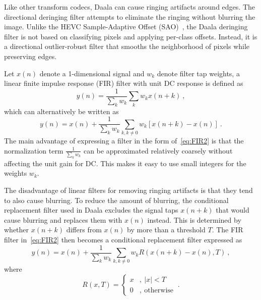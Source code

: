\documentclass[english,conference,10pt]{IEEEtran}
\begin{document}
Like other transform codecs, Daala can cause ringing artifacts around edges.
The directional deringing filter attempts to eliminate the ringing without
blurring the image. Unlike the HEVC Sample-Adaptive Offset (SAO)~\cite{HEVC-SAO},
the Daala deringing filter is not based on classifying pixels and applying per-class
offsets. Instead, it is a directional outlier-robust filter that smooths the
neighborhood of pixels while preserving edges.

Let $x\left(n\right)$ denote a 1-dimensional signal and $w_{k}$
denote filter tap weights, a linear finite impulse response (FIR)
filter with unit DC response is defined as
\begin{equation}
y\left(n\right)=\frac{1}{\sum_{k}w_{k}}\sum_{k}w_{k}x\left(n+k\right)\ ,\label{eq:FIR1}
\end{equation}
which can alternatively be written as
\begin{equation}
y\left(n\right)=x\left(n\right)+\frac{1}{\sum_{k}w_{k}}\sum_{k,k\neq0}w_{k}\left[x\left(n+k\right)-x\left(n\right)\right]\ .\label{eq:FIR2}
\end{equation}
The main advantage of expressing a filter in the form of~\cref{eq:FIR2}
is that the normalization term $\frac{1}{\sum_{k}w_{k}}$ can be approximated
relatively coarsely without affecting the unit gain for DC\@. This makes
it easy to use small integers for the weights $w_{k}$.

The disadvantage of linear filters for removing ringing artifacts
is that they tend to also cause blurring. To reduce the amount of
blurring, the conditional replacement filter used in Daala excludes
the signal taps $x\left(n+k\right)$ that would cause blurring and
replaces them with $x\left(n\right)$ instead. This is determined
by whether $x\left(n+k\right)$ differs from $x\left(n\right)$ by
more than a threshold $T$. The FIR filter in~\cref{eq:FIR2}
then becomes a conditional replacement filter expressed as
\begin{equation}
y\left(n\right)=x\left(n\right)+\frac{1}{\sum_{k}w_{k}}\sum_{k,k\neq0}w_{k}R\left(x\left(n+k\right)-x\left(n\right),T\right)\ ,\label{eq:CRF}
\end{equation}
where
\begin{equation}
R\left(x,T\right)=\left\{ \begin{array}{ll}
x & ,\ \left|x\right|<T\\
0 & ,\ \mathrm{otherwise}
\end{array}\right.\ .
\end{equation}
\end{document}
